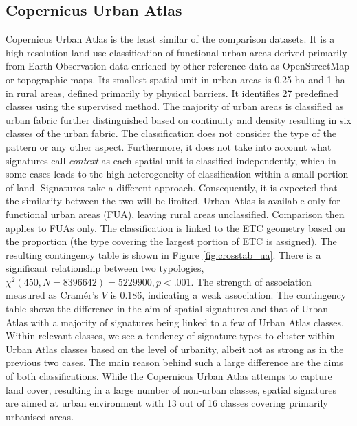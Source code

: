 \documentclass[fleqn,10pt]{wlscirep}
\begin{document}
\subsection*{Copernicus Urban Atlas}
Copernicus Urban Atlas is the least similar of the comparison datasets. It is a
high-resolution land use classification of functional urban areas derived primarily from
Earth Observation data enriched by other reference data as OpenStreetMap or topographic
maps. Its smallest spatial unit in urban areas is 0.25 ha and 1 ha in rural areas,
defined primarily by physical barriers. It identifies
27 predefined classes using the supervised method.
The majority of urban areas is classified as urban fabric further distinguished based on
continuity and density resulting in six classes of the urban fabric. The classification does
not consider the type of the pattern or any other aspect. Furthermore, it does not take
into account what signatures call \textit{context} as each spatial unit is
classified independently, which in some cases leads to the high heterogeneity of
classification within a small portion of land. Signatures take a different approach.
Consequently, it is expected that the similarity between the two will be limited.
Urban Atlas is available only for functional urban areas (FUA), leaving rural areas
unclassified. Comparison then applies to FUAs only. The classification is linked to the
ETC geometry based on the proportion (the type covering the largest portion of ETC is
assigned). The resulting contingency table is shown in Figure \ref{fig:crosstab_ua}. There is a
significant relationship between two typologies, $\chi^{2} (450, N = 8396642) = 5229900,
p < .001$. The strength of association measured as Cramér's $V$ is $0.186$, indicating
a weak association. The contingency table shows the difference in the aim of spatial
signatures and that of Urban Atlas with a majority of signatures being linked to a few
of Urban Atlas classes. Within relevant classes, we see a tendency of signature types to
cluster within Urban Atlas classes based on the level of urbanity, albeit not as strong
as in the previous two cases.
The main reason behind such a large difference are the aims of both classifications. While
the Copernicus Urban Atlas attemps to capture land cover, resulting in a large number
of non-urban classes, spatial signatures are aimed at urban environment with 13 out of 16
classes covering primarily urbanised areas.
\end{document}
